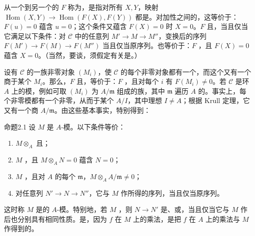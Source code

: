 
从一个到另一个的 $F$ 称为，是指对所有 $X,Y$，映射
$\operatorname{Hom}(X,Y)\to\operatorname{Hom}(F(X),F(Y))$ 都是。对加性之间的，这等价于：$F(u)=0$ 蕴含 $u=0$；这个条件又蕴含 $F(X)=0$ 时 $X=0$。$F$ 且，当且仅当它满足以下条件：对 $\mathcal C$ 中的任意列 $M'\to M\to M''$，变换后的序列 $F(M')\to F(M)\to F(M'')$ 当且仅当原序列。也等价于：$F$ ，且 $F(X)=0$ 蕴含 $X=0$。（当然，要谈，须假定有关是。）

设有 $\mathcal C$ 的一族非零对象 $(M_i)$，使 $\mathcal C$ 的每个非零对象都有一个，而这个又有一个商于某个 $M_i$。那么，$F$ 且，等价于：$F$ ，且对每个 $i$ 有 $F(M_i)\ne0$。若 $\mathcal C$ 是环 $A$ 上的模，例如可取 $(M_i)$ 为 $A/\mathfrak m$ 组成的族，其中 $\mathfrak m$ 遍历 $A$ 的。事实上，每个非零模都有一个非零，从而于某个 $A/I$，其中理想 $I\ne A$；根据 Krull 定理，它又有一个商 $A/\mathfrak m$。由这些基本事实，特别得到：

\begin{SGAresult}{命题}{2.1}
设 $M$ 是 $A$-模。以下条件等价：
\begin{enumerate}
\item[(i)]  $M\otimes_A$ 且；
\item[(i bis)] $M$ ，且 $M\otimes_A N=0$ 蕴含 $N=0$；
\item[(i ter)] $M$ ，且对 $A$ 的每个 $\mathfrak m$，$M\otimes_A A/\mathfrak m\ne0$；
\item[(ii)] 对任意列 $N'\to N\to N''$，它与 $M$ 作所得的序列，当且仅当原序列。
\end{enumerate}
\end{SGAresult}
这时称 $M$ 是的 $A$-模。特别地，若 $M$ ，则 $N\to N'$ 是、或，当且仅当它与 $M$ 作后也分别具有相同性质。是，因为 $f$ 在 $M$ 上的乘法，是把 $f$ 在 $A$ 上的乘法与 $M$ 作得到的。

